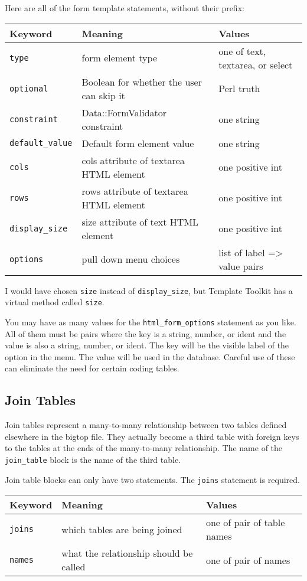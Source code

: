 Here are all of the form template statements, without their prefix:

\begin{tabular}{l|l|l}
Keyword & Meaning & Values \\
\hline
\verb+type+  & form element type & one of text, textarea, or select \\
\verb+optional+ & Boolean for whether the user can skip it & Perl truth \\
\verb+constraint+ & Data::FormValidator constraint & one string \\
\verb+default_value+ & Default form element value & one string \\
\verb+cols+ & cols attribute of textarea HTML element & one positive int \\
\verb+rows+ & rows attribute of textarea HTML element & one positive int \\
\verb+display_size+ & size attribute of text HTML element & one positive int \\
\verb+options+ & pull down menu choices & list of label => value pairs \\
\end{tabular}

I would have chosen \verb+size+ instead of \verb+display_size+, but
Template Toolkit has a virtual method called \verb+size+.

You may have as many values for the \verb+html_form_options+ statement
as you like.  All of them must be pairs where the key is a string, number,
or ident and the value is also a string, number, or ident.  The key will
be the visible label of the option in the menu.  The value will be used
in the database.  Careful use of these can eliminate the need for certain
coding tables.

\subsection*{Join Tables}

Join tables represent a many-to-many relationship between two tables
defined elsewhere in the bigtop file.  They actually become a third
table with foreign keys to the tables at the ends of the many-to-many
relationship.  The name of the \verb+join_table+ block is the name of the
third table.

Join table blocks can only have two statements.  The \verb+joins+ statement
is required.

\begin{tabular}{l|l|l}
Keyword & Meaning & Values \\
\hline
\verb+joins+ & which tables are being joined & one of pair of table names \\
\verb+names+ & what the relationship should be called & one of pair of names \\
\end{tabular}

